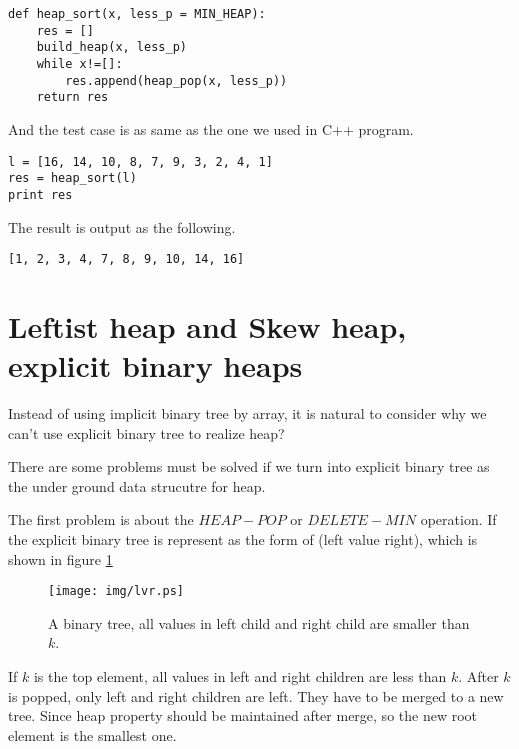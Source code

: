 \documentclass{article}
\begin{document}
\lstset{language=Python}
\begin{lstlisting}
def heap_sort(x, less_p = MIN_HEAP):
    res = []
    build_heap(x, less_p)
    while x!=[]:
        res.append(heap_pop(x, less_p))
    return res
\end{lstlisting}

And the test case is as same as the one we used in C++ program.

\begin{lstlisting}
l = [16, 14, 10, 8, 7, 9, 3, 2, 4, 1]
res = heap_sort(l)
print res
\end{lstlisting}

The result is output as the following.

\begin{verbatim}
[1, 2, 3, 4, 7, 8, 9, 10, 14, 16]
\end{verbatim}

\section{Leftist heap and Skew heap, explicit binary heaps}
\label{ebheap}

Instead of using implicit binary tree by array, it is natural to
consider why we can't use explicit binary tree to realize heap?

There are some problems must be solved if we turn into explicit
binary tree as the under ground data strucutre for heap.

The first problem is about the $HEAP-POP$ or $DELETE-MIN$ operation.
If the explicit binary tree is represent as the form of
(left value right), which is shown in figure \ref{fig:lvr}

\begin{figure}[htbp]
       \begin{center}
       	  \texttt{[image: img/lvr.ps]}
        \caption{A binary tree, all values in left child and right child are smaller than $k$.} \label{fig:lvr}
       \end{center}
\end{figure}

If $k$ is the top element, all values in left and right children are less
than $k$. After $k$ is popped, only left and right children are left.
They have to be merged to a new tree. Since heap property should be maintained
after merge, so the new root element is the smallest one.
\end{document}
